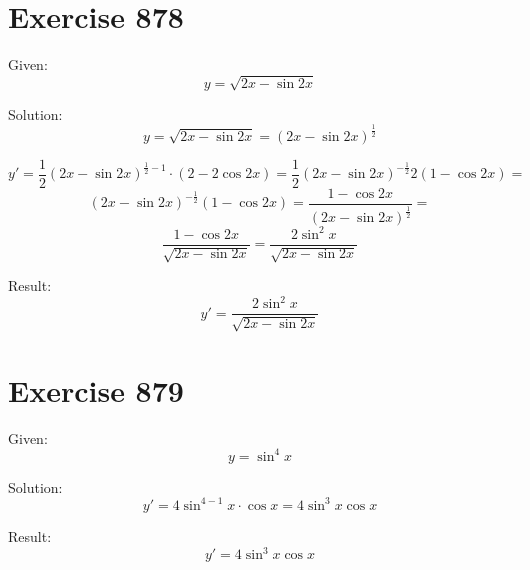 \documentclass[a4paper, 10pt]{scrartcl}
\begin{document}
\section{Exercise 878}

Given:
\[
y = \sqrt{2x - \sin{2x}}
\]

Solution:
\[
y = \sqrt{2x - \sin{2x}} = (2x - \sin{2x})^{\frac{1}{2}}
\]

\[
y' = \frac{1}{2}(2x - \sin{2x})^{\frac{1}{2} - 1}\cdot(2 - 2\cos{2x}) = \frac{1}{2}(2x - \sin{2x})^{-\frac{1}{2}}2(1 - \cos{2x}) =
\]
\[
(2x - \sin{2x})^{-\frac{1}{2}}(1 - \cos{2x}) = \frac{1 - \cos{2x}}{(2x - \sin{2x})^{\frac{1}{2}}} =
\]
\[
\frac{1 - \cos{2x}}{\sqrt{2x - \sin{2x}}} = \frac{2\sin^{2}{x}}{\sqrt{2x - \sin{2x}}}
\]

Result:
\[
y' = \frac{2\sin^{2}{x}}{\sqrt{2x - \sin{2x}}}
\]

\section{Exercise 879}

Given:
\[
y = \sin^{4}{x}
\]

Solution:
\[
y' = 4\sin^{4 - 1}{x}\cdot\cos{x} = 4\sin^{3}{x}\cos{x}
\]

Result:
\[
y' = 4\sin^{3}{x}\cos{x}
\]
\end{document}
